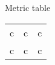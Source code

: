 
Metric table

\begin{tabular}{ |c|c|c| }
    \hline
    c & c & c \\
    c & c & c \\
    \hline
\end{tabular}